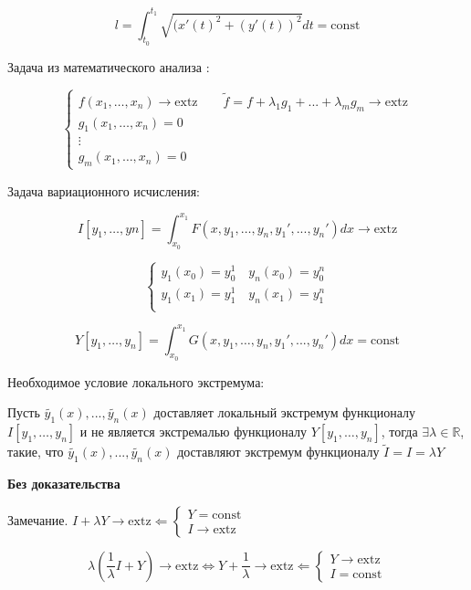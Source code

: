 \documentclass[12pt, a4paper]{report}
\begin{document}
\[ l = \int_{t_0 }^{t_1} \sqrt{(x' (t ) ^2 + (y '(t ) )^2 } dt = \mathrm{const}   \] 

Задача из математического анализа : 

\[ \begin{cases}
f(x_1, \ldots, x_n ) \to  \mathrm{extz}   \quad \quad  \tilde{f } =f + \lambda_1 g_1 + ... + \lambda_m g_m \to  \mathrm{extz}   \\
g_1 (x_1, \ldots, x_n ) = 0 \\
\vdots \\
g_m (x_1, \ldots, x_n ) = 0
\end{cases} \] 

Задача вариационного исчисления: 

\[ I[y_1, \ldots, yn] = \int_{x_0 }^{x_1 } F(x,y_1, \ldots, y_n,y_1',..., y_n') dx \to  \mathrm{extz}   \] 

\[ \begin{cases}
y_1(x_0 ) = y_0 ^1 \quad  y_n(x_0 ) = y_0 ^n \\
y_1(x_1 ) = y_1 ^1 \quad  y_n(x_1 ) = y_1 ^n \\
\end{cases} \] 

\[ Y[y_1, \ldots, y_n ] = \int_{x_0 }^{x_1} G(x,y_1, \ldots, y_n,y_1',..., y_n')dx = \mathrm{const}    \] 

Необходимое условие локального экстремума:

Пусть \( \tilde{y_1 }(x ),..., \tilde{y_n}(x) \) доставляет локальный экстремум функционалу \( I[y_1, \ldots, y_n] \)  и не является экстремалью функционалу \( Y[y_1, \ldots, y_n] \), тогда \( \exists  \lambda \in  \mathbb{R} \), такие, что \( \tilde{y_1}(x),..., \tilde{y_n}(x) \) доставляют экстремум функционалу \( \tilde{I } = I = \lambda Y \) 

\textbf{Без доказательства}

Замечание. \( I + \lambda Y \to  \mathrm{extz}  \Leftarrow \begin{cases}
    Y   = \mathrm{const}  \\
    I\to  \mathrm{extz} 
    \end{cases}  \) 

\[ \lambda \left( \frac{1}{\lambda }I + Y   \right) \to  \mathrm{extz} \Leftrightarrow Y+ \frac{1}{\lambda } \to  \mathrm{extz}  \Leftarrow \begin{cases}
Y \to  \mathrm{extz}  \\
I = \mathrm{const}  
\end{cases} \] 
\end{document}
